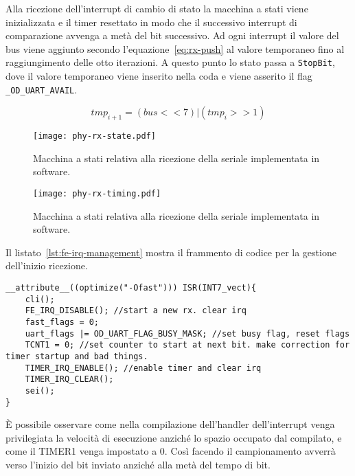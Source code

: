 Alla ricezione dell'interrupt di cambio di stato la macchina a stati viene inizializzata e il timer resettato in modo che il successivo interrupt di comparazione avvenga a metà del bit successivo. Ad ogni interrupt il valore del bus viene aggiunto secondo l'equazione~\ref{eq:rx-push} al valore temporaneo fino al raggiungimento delle otto iterazioni. A questo punto lo stato passa a \texttt{StopBit}, dove il valore temporaneo viene inserito nella coda e viene asserito il flag \texttt{\_OD\_UART\_AVAIL}.

\begin{equation}\label{eq:rx-push}
    tmp_{i+1} = (bus << 7) | (tmp_i >> 1)
\end{equation}

\begin{figure}[p]
    \centering
    \texttt{[image: phy-rx-state.pdf]}
    \caption[]{Macchina a stati relativa alla ricezione della seriale implementata in software.}\label{fig:phy-rx-state}
\end{figure}

\begin{figure}[p]
    \centering
    \texttt{[image: phy-rx-timing.pdf]}
    \caption[]{Macchina a stati relativa alla ricezione della seriale implementata in software.}\label{fig:phy-rx-timing}
\end{figure}

Il listato~\ref{lst:fe-irq-management} mostra il frammento di codice per la gestione dell'inizio ricezione. 

\noindent\begin{minipage}{\textwidth}
    \begin{lstlisting}[style=C, caption={IRQ di gestione inizio trasmissione}, label=lst:fe-irq-management]
__attribute__((optimize("-Ofast"))) ISR(INT7_vect){
    cli();
    FE_IRQ_DISABLE(); //start a new rx. clear irq
    fast_flags = 0;
    uart_flags |= OD_UART_FLAG_BUSY_MASK; //set busy flag, reset flags
    TCNT1 = 0; //set counter to start at next bit. make correction for timer startup and bad things.
    TIMER_IRQ_ENABLE(); //enable timer and clear irq
    TIMER_IRQ_CLEAR();
    sei();
}
    \end{lstlisting}
\end{minipage}

È possibile osservare come nella compilazione dell'handler dell'interrupt venga privilegiata la velocità di esecuzione anziché lo spazio occupato dal compilato, e come il TIMER1 venga impostato a 0. Così facendo il campionamento avverrà verso l'inizio del bit inviato anziché alla metà del tempo di bit. 

